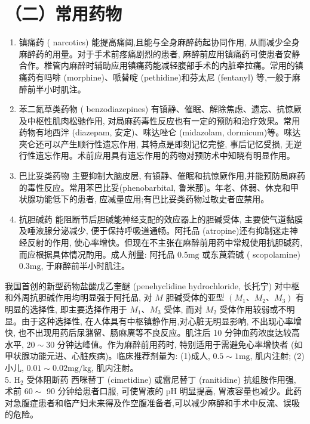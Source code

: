 \documentclass[10pt]{article}
\begin{document}
\section*{（二）常用药物}
\begin{enumerate}
  \item 镇痛药 ( narcotics) 能提高痛阈,且能与全身麻醉药起协同作用, 从而减少全身麻醉药的用量。对于手术前疼痛剧烈的患者, 麻醉前应用镇痛药可使患者安静合作。椎管内麻醉时辅助应用镇痛药能减轻腹部手术的内脏牵拉痛。常用的镇痛药有吗啡 (morphine)、哌替啶 (pethidine)和芬太尼 (fentanyl) 等,一般于麻醉前半小时肌注。

  \item 苯二氮草类药物 ( benzodiazepines) 有镇静、催眠、解除焦虑、遗忘、抗惊厥及中枢性肌肉松驰作用, 对局麻药毒性反应也有一定的预防和治疗效果。常用药物有地西泮 (diazepam, 安定)、咪达唑仑 (midazolam, dormicum)等。咪达夾仑还可以产生顺行性遗忘作用, 其特点是即刻记忆完整, 事后记忆受损, 无逆行性遗忘作用。术前应用具有遗忘作用的药物对预防术中知晓有明显作用。

  \item 巴比妥类药物 主要抑制大脑皮层, 有镇静、催眠和抗惊厥作用,并能预防局麻药的毒性反应。常用苯巴比妥(phenobarbital, 鲁米那)。年老、体弱、休克和甲状腺功能低下的患者, 应减量应用;有巴比妥类药物过敏史者应禁用。

  \item 抗胆碱药 能阻断节后胆碱能神经支配的效应器上的胆碱受体, 主要使气道黏膜及唾液腺分泌减少, 便于保持呼吸道通畅。阿托品 (atropine)还有抑制迷走神经反射的作用, 使心率增快。但现在不主张在麻醉前用药中常规使用抗胆碱药,而应根据具体情况酌用。成人剂量: 阿托品 $0.5 \mathrm{mg}$ 或东莨菪碱 ( scopolamine) $0.3 \mathrm{mg}$, 于麻醉前半小时肌注。

\end{enumerate}

我国首创的新型药物盐酸戊乙奎醚 (penehyclidine hydrochloride, 长托宁) 对中枢和外周抗胆碱作用均明显强于阿托品, 对 $M$ 胆碱受体的亚型 $\left(M_{1} 、 M_{2} 、 M_{3}\right)$ 有明显的选择性, 即主要选择作用于 $M_{1} 、 M_{3}$ 受体, 而对 $M_{2}$ 受体作用较弱或不明显。由于这种选择性, 在人体具有中枢镇静作用,对心脏无明显影响, 不出现心率增快, 也不出现用药后尿潴留、肠麻廙等不良反应。肌注后 10 分钟血药浓度达较高水平, $20 \sim 30$ 分钟达峰值。作为麻醉前用药时, 特别适用于需避免心率增快者 (如甲状腺功能元进、心脏疾病)。临床推荐剂量为: (1)成人, $0.5 \sim 1 \mathrm{mg}$, 肌内注射; (2)小儿, $0.01 \sim 0.02 \mathrm{mg} / \mathrm{kg}$, 肌内注射。\\
5. $\mathrm{H}_{2}$ 受体阻断药 西咪替丁 (cimetidine) 或雷尼替丁 (ranitidine) 抗组胺作用强, 术前 $60 \sim$ 90 分钟给患者口服, 可使胃液的 $\mathrm{pH}$ 明显提高, 胃液容量也减少。此药对急腹症患者和临产妇未来得及作空腹准备者,可以减少麻醉和手术中反流、误吸的危险。
\end{document}

